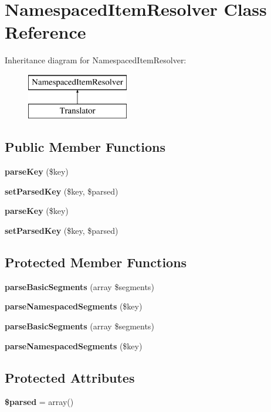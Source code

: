 \section{Namespaced\+Item\+Resolver Class Reference}
\label{class_illuminate_1_1_support_1_1_namespaced_item_resolver}
Inheritance diagram for Namespaced\+Item\+Resolver\+:\begin{figure}[H]
\begin{center}
\leavevmode
\includegraphics[height=2.000000cm]{class_illuminate_1_1_support_1_1_namespaced_item_resolver}
\end{center}
\end{figure}
\subsection*{Public Member Functions}
\begin{DoxyCompactItemize}
\item 
{\bf parse\+Key} (\$key)
\item 
{\bf set\+Parsed\+Key} (\$key, \$parsed)
\item 
{\bf parse\+Key} (\$key)
\item 
{\bf set\+Parsed\+Key} (\$key, \$parsed)
\end{DoxyCompactItemize}
\subsection*{Protected Member Functions}
\begin{DoxyCompactItemize}
\item 
{\bf parse\+Basic\+Segments} (array \$segments)
\item 
{\bf parse\+Namespaced\+Segments} (\$key)
\item 
{\bf parse\+Basic\+Segments} (array \$segments)
\item 
{\bf parse\+Namespaced\+Segments} (\$key)
\end{DoxyCompactItemize}
\subsection*{Protected Attributes}
\begin{DoxyCompactItemize}
\item 
{\bf \$parsed} = array()
\end{DoxyCompactItemize}


